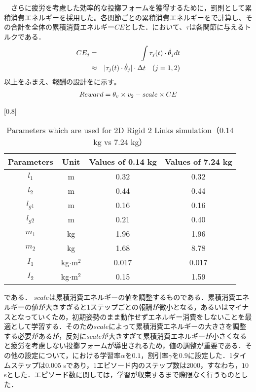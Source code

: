 \begin{small}
　さらに疲労を考慮した効率的な投擲フォームを獲得するために，罰則として累積消費エネルギーを採用した。各関節ごとの累積消費エネルギーをで計算し、その合計を全体の累積消費エネルギー$CE$とした．において、$\tau$は各関節に与えるトルクである．
\begin{eqnarray}
  \equlabel{8}
  CE_{j}&=&\int \tau_{j}(t)\cdot\dot{\theta}_{j} dt \nonumber \\
        &\approx&|\tau_{j}(t)\cdot\dot{\theta}_{j}|\cdot\Delta t \quad(j = 1,2)
\end{eqnarray}
以上をふまえ、報酬の設計をに示す。
\begin{eqnarray}
  \equlabel{9}
  Reward = \theta_{v} \times v_{2} - scale \times CE
\end{eqnarray}
\begin{table}[tb]
  \begin{center}
    \caption{Parameters which are used for 2D Rigid 2 Links simulation（0.14 kg vs 7.24 kg）}
    \scalebox{0.8}[0.8]{
    \begin{tabular}{c|c|c|c}
      \hline
      Parameters & Unit & Values of 0.14 kg & Values of 7.24 kg \\
      \hline
      $l_{1}$ & m & 0.32 & 0.32\\
      $l_{2}$ & m & 0.44 & 0.44\\
      $l_{g1}$ & m & 0.16 & 0.16 \\
      $l_{g2}$ & m & 0.21 & 0.40 \\
      $m_{1}$ & kg & 1.96 & 1.96\\
      $m_{2}$ & kg & 1.68 & 8.78 \\
      $I_{1}$ & kg$\cdot$$\mathrm{m}^2$ & 0.017 & 0.017 \\
      $I_{2}$ & kg$\cdot$$\mathrm{m}^2$ & 0.15 & 1.59 \\
      \hline
    \end{tabular}
    }
  \end{center}
\end{table}
である．
$scale$は累積消費エネルギーの値を調整するものである．累積消費エネルギーの値が大きすぎると1ステップごとの報酬が微小となる，あるいはマイナスとなっていくため，初期姿勢のまま動作せずエネルギー消費をしないことを最適として学習する．そのため$scale$によって累積消費エネルギーの大きさを調整する必要があるが，反対に$scale$が大きすぎて累積消費エネルギーが小さくなると疲労を考慮しない投擲フォームが導出されるため，値の調整が重要である．その他の設定について，における学習率$\alpha$を$0.1$，割引率$\gamma$を$0.9$に設定した．1タイムステップは$0.005$ sであり，1エピソード内のステップ数は2000，すなわち，$10$ sとした．エピソード数に関しては，学習が収束するまで際限なく行うものとした．


\end{small}
